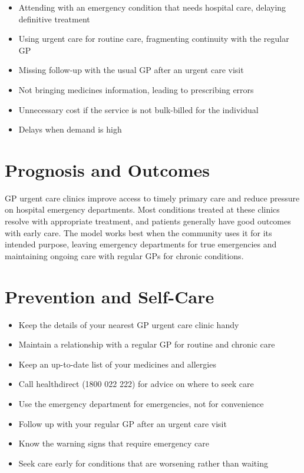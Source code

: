 \begin{itemize}
    \item Attending with an emergency condition that needs hospital care, delaying definitive treatment
    \item Using urgent care for routine care, fragmenting continuity with the regular GP
    \item Missing follow-up with the usual GP after an urgent care visit
    \item Not bringing medicines information, leading to prescribing errors
    \item Unnecessary cost if the service is not bulk-billed for the individual
    \item Delays when demand is high
\end{itemize}

\section*{Prognosis and Outcomes}
GP urgent care clinics improve access to timely primary care and reduce pressure on hospital emergency departments. Most conditions treated at these clinics resolve with appropriate treatment, and patients generally have good outcomes with early care. The model works best when the community uses it for its intended purpose, leaving emergency departments for true emergencies and maintaining ongoing care with regular GPs for chronic conditions.

\section*{Prevention and Self-Care}
\begin{itemize}
    \item Keep the details of your nearest GP urgent care clinic handy
    \item Maintain a relationship with a regular GP for routine and chronic care
    \item Keep an up-to-date list of your medicines and allergies
    \item Call healthdirect (1800 022 222) for advice on where to seek care
    \item Use the emergency department for emergencies, not for convenience
    \item Follow up with your regular GP after an urgent care visit
    \item Know the warning signs that require emergency care
    \item Seek care early for conditions that are worsening rather than waiting
\end{itemize}

